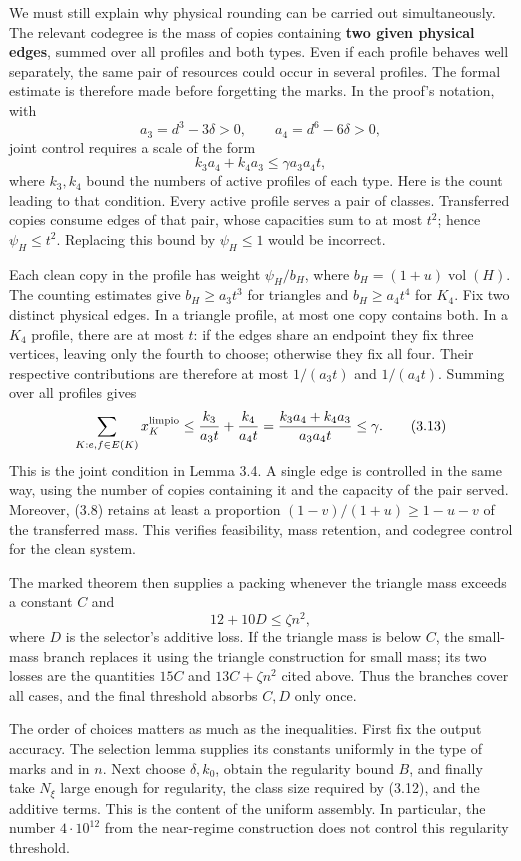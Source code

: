 \documentclass[english,11pt,a4paper]{article}
\begin{document}
We must still explain why physical rounding can be carried out simultaneously. The relevant codegree is the mass of copies containing \textbf{two given physical edges}, summed over all profiles and both types. Even if each profile behaves well separately, the same pair of resources could occur in several profiles. The formal estimate is therefore made before forgetting the marks. In the proof's notation, with \[
a_3=d^3-3\delta>0,\qquad a_4=d^6-6\delta>0,
\] joint control requires a scale of the form \[
k_3a_4+k_4a_3\le\gamma a_3a_4t,
\tag{3.12}
\] where \(k_3,k_4\) bound the numbers of active profiles of each type. Here is the count leading to that condition. Every active profile serves a pair of classes. Transferred copies consume edges of that pair, whose capacities sum to at most \(t^2\); hence \(\psi_H\le t^2\). Replacing this bound by \(\psi_H\le1\) would be incorrect.

Each clean copy in the profile has weight \(\psi_H/b_H\), where \(b_H=(1+u)\operatorname{vol}(H)\). The counting estimates give \(b_H\ge a_3t^3\) for triangles and \(b_H\ge a_4t^4\) for \(K_4\). Fix two distinct physical edges. In a triangle profile, at most one copy contains both. In a \(K_4\) profile, there are at most \(t\): if the edges share an endpoint they fix three vertices, leaving only the fourth to choose; otherwise they fix all four. Their respective contributions are therefore at most \(1/(a_3t)\) and \(1/(a_4t)\). Summing over all profiles gives \[
\sum_{K:e,f\in E(K)}x_K^{\rm limpio}
\le\frac{k_3}{a_3t}+\frac{k_4}{a_4t}
=\frac{k_3a_4+k_4a_3}{a_3a_4t}\le\gamma.
\tag{3.13}
\] This is the joint condition in Lemma 3.4. A single edge is controlled in the same way, using the number of copies containing it and the capacity of the pair served. Moreover, (3.8) retains at least a proportion \((1-v)/(1+u)\ge1-u-v\) of the transferred mass. This verifies feasibility, mass retention, and codegree control for the clean system.

The marked theorem then supplies a packing whenever the triangle mass exceeds a constant \(C\) and \[
12+10D\le\zeta n^2,
\tag{3.14}
\] where \(D\) is the selector's additive loss. If the triangle mass is below \(C\), the small-mass branch replaces it using the triangle construction for small mass; its two losses are the quantities \(15C\) and \(13C+\zeta n^2\) cited above. Thus the branches cover all cases, and the final threshold absorbs \(C,D\) only once.

The order of choices matters as much as the inequalities. First fix the output accuracy. The selection lemma supplies its constants uniformly in the type of marks and in \(n\). Next choose \(\delta,k_0\), obtain the regularity bound \(B\), and finally take \(N_\xi\) large enough for regularity, the class size required by (3.12), and the additive terms. This is the content of the uniform assembly. In particular, the number \(4\cdot10^{12}\) from the near-regime construction does not control this regularity threshold.
\end{document}
